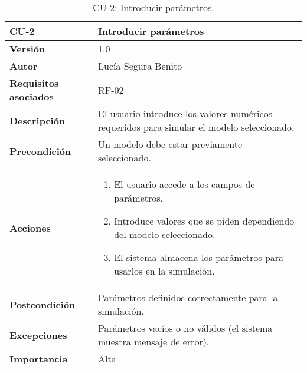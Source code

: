 \begin{table}[H]
\centering
\begin{tabular}{|p{3cm}|p{9cm}|}
\hline
\textbf{CU-2} & \textbf{Introducir parámetros} \\
\hline
\textbf{Versión} & 1.0 \\
\hline
\textbf{Autor} & Lucía Segura Benito \\
\hline
\textbf{Requisitos asociados} & RF-02 \\
\hline
\textbf{Descripción} & El usuario introduce los valores numéricos requeridos para simular el modelo seleccionado. \\
\hline
\textbf{Precondición} & Un modelo debe estar previamente seleccionado. \\
\hline
\textbf{Acciones} &
\begin{enumerate}
    \item El usuario accede a los campos de parámetros.
    \item Introduce valores que se piden dependiendo del modelo seleccionado.
    \item El sistema almacena los parámetros para usarlos en la simulación.
\end{enumerate}
\\
\hline
\textbf{Postcondición} & Parámetros definidos correctamente para la simulación. \\
\hline
\textbf{Excepciones} & Parámetros vacíos o no válidos (el sistema muestra mensaje de error). \\
\hline
\textbf{Importancia} & Alta \\
\hline
\end{tabular}
\caption{CU-2: Introducir parámetros.}
\label{tab:cu2}
\end{table}







